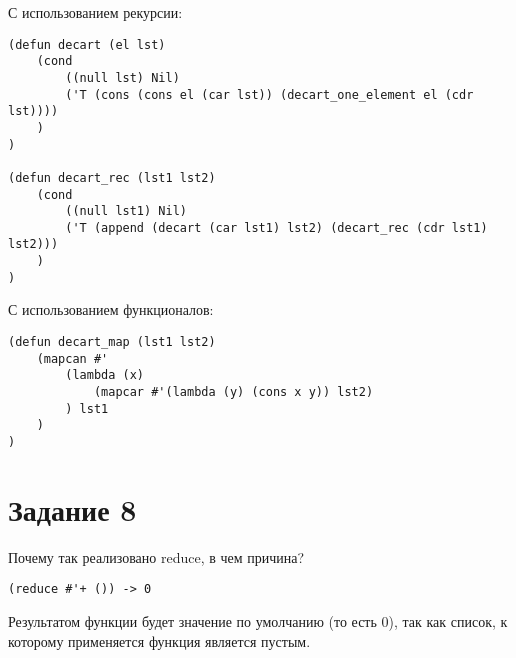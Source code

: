 С использованием рекурсии:

\begin{lstlisting}
(defun decart (el lst)
    (cond
        ((null lst) Nil)
        ('T (cons (cons el (car lst)) (decart_one_element el (cdr lst))))
    )
)

(defun decart_rec (lst1 lst2)
    (cond
        ((null lst1) Nil)
        ('T (append (decart (car lst1) lst2) (decart_rec (cdr lst1) lst2)))
    )
)
\end{lstlisting}

С использованием функционалов:

\begin{lstlisting}
(defun decart_map (lst1 lst2)
    (mapcan #'
        (lambda (x)
            (mapcar #'(lambda (y) (cons x y)) lst2)
        ) lst1
    )
)
\end{lstlisting}

\section{Задание \No{}8}

Почему так реализовано reduce, в чем причина?

\begin{lstlisting}
(reduce #'+ ()) -> 0
\end{lstlisting}

Результатом функции будет значение по умолчанию (то есть 0), так как список, к которому применяется функция является пустым.
